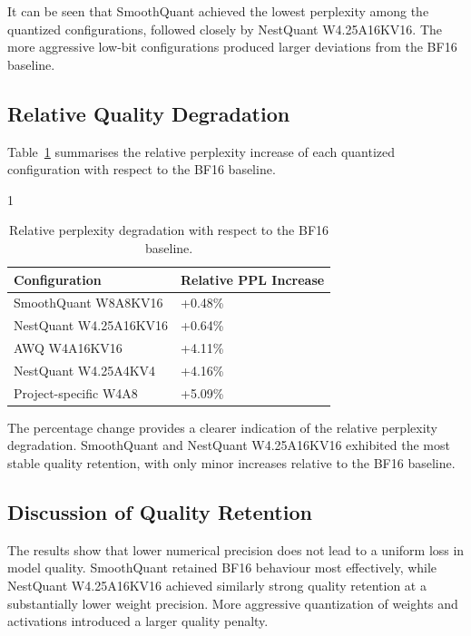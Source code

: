 It can be seen that SmoothQuant achieved the lowest perplexity among the quantized
configurations, followed closely by NestQuant W4.25A16KV16. The more
aggressive low-bit configurations produced larger deviations from the
BF16 baseline.

\subsection{Relative Quality Degradation}
Table~\ref{tab:relative-quality-degradation} summarises the relative
perplexity increase of each quantized configuration with respect to the
BF16 baseline.

\begin{table}[htbp]
\centering
\caption{Relative perplexity degradation with respect to the BF16 baseline.}
\label{tab:relative-quality-degradation}

\begin{spacing}{1}
\small
\renewcommand{\arraystretch}{1.18}

\begin{tabularx}{0.78\textwidth}{
@{}
>{\raggedright\arraybackslash}X
>{\centering\arraybackslash}p{}
@{}
}
\toprule
\textbf{Configuration} &
\textbf{Relative PPL Increase} \\
\midrule

SmoothQuant W8A8KV16   & +0.48\% \\
NestQuant W4.25A16KV16 & +0.64\% \\
AWQ W4A16KV16          & +4.11\% \\
NestQuant W4.25A4KV4   & +4.16\% \\
Project-specific W4A8  & +5.09\% \\

\bottomrule
\end{tabularx}
\end{spacing}
\end{table}

The percentage change provides a clearer indication of the relative
perplexity degradation. SmoothQuant and NestQuant W4.25A16KV16 exhibited
the most stable quality retention, with only minor increases relative to
the BF16 baseline.

\subsection{Discussion of Quality Retention}

The results show that lower numerical precision does not lead to a
uniform loss in model quality. SmoothQuant retained BF16 behaviour most
effectively, while NestQuant W4.25A16KV16 achieved similarly strong
quality retention at a substantially lower weight precision. More
aggressive quantization of weights and activations introduced a larger
quality penalty.

